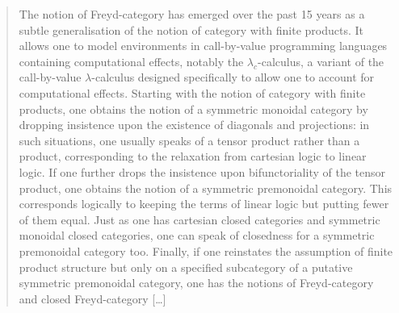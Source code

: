 \begin{quote}
    The notion of Freyd-category has emerged over the past 15 years as a subtle
    generalisation of the notion of category with finite products. It allows
    one to model environments in call-by-value programming languages containing
    computational effects, notably the $\lambda_c$-calculus, a variant of the
    call-by-value $\lambda$-calculus designed specifically to allow one to account
    for computational effects. Starting with the notion of category with finite
    products, one obtains the notion of a symmetric monoidal category by
    dropping insistence upon the existence of diagonals and projections: in
    such situations, one usually speaks of a tensor product rather than a
    product, corresponding to the relaxation from cartesian logic to linear
    logic. If one further drops the insistence upon bifunctoriality of the
    tensor product, one obtains the notion of a symmetric premonoidal category.
    This corresponds logically to keeping the terms of linear logic but putting
    fewer of them equal.  Just as one has cartesian closed categories and
    symmetric monoidal closed categories, one can speak of closedness for a
    symmetric premonoidal category too. Finally, if one reinstates the
    assumption of finite product structure but only on a specified subcategory
    of a putative symmetric premonoidal category, one has the notions of
    Freyd-category and closed Freyd-category [\ldots]
\end{quote}
